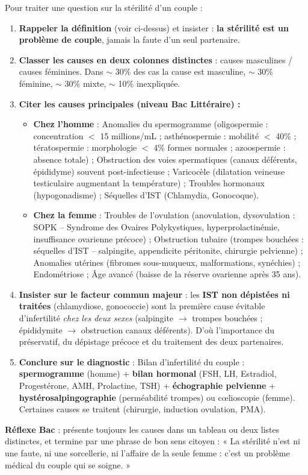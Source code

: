 \documentclass[11pt]{article}
\newcommand{\cle}[1]{{\popxbold\color{popdark}#1}}
\begin{document}
\begin{methode}
Pour traiter une question sur la stérilité d'un couple :
\begin{enumerate}
\item \textbf{Rappeler la définition} (voir ci-dessus) et insister : \textbf{la stérilité est un problème de couple}, jamais la faute d'un seul partenaire.
\item \textbf{Classer les causes en deux colonnes distinctes} : causes masculines / causes féminines. Dans $\sim$ 30\% des cas la cause est masculine, $\sim$ 30\% féminine, $\sim$ 30\% mixte, $\sim$ 10\% inexpliquée.
\item \textbf{Citer les causes principales (niveau Bac Littéraire) :}
\begin{itemize}
\item \textbf{Chez l'homme} : \cle{Anomalies du spermogramme} (oligospermie : concentration $<$ 15 millions/mL ; asthénospermie : mobilité $<$ 40\% ; tératospermie : morphologie $<$ 4\% formes normales ; azoospermie : absence totale) ; \cle{Obstruction} des voies spermatiques (canaux déférents, épididyme) souvent post-infectieuse ; \cle{Varicocèle} (dilatation veineuse testiculaire augmentant la température) ; \cle{Troubles hormonaux} (hypogonadisme) ; \cle{Séquelles d'IST} (Chlamydia, Gonocoque).
\item \textbf{Chez la femme} : \cle{Troubles de l'ovulation} (anovulation, dysovulation : SOPK -- Syndrome des Ovaires Polykystiques, hyperprolactinémie, insuffisance ovarienne précoce) ; \cle{Obstruction tubaire} (trompes bouchées : séquelles d'IST -- salpingite, appendicite péritonite, chirurgie pelvienne) ; \cle{Anomalies utérines} (fibromes sous-muqueux, malformations, synéchies) ; \cle{Endométriose} ; \cle{Âge avancé} (baisse de la réserve ovarienne après 35 ans).
\end{itemize}
\item \textbf{Insister sur le facteur commun majeur} : les \textbf{IST non dépistées ni traitées} (chlamydiose, gonococcie) sont la première cause évitable d'infertilité \emph{chez les deux sexes} (salpingite $\rightarrow$ trompes bouchées ; épididymite $\rightarrow$ obstruction canaux déférents). D'où l'importance du préservatif, du dépistage précoce et du traitement des deux partenaires.
\item \textbf{Conclure sur le diagnostic} : Bilan d'infertilité du couple : \textbf{spermogramme} (homme) + \textbf{bilan hormonal} (FSH, LH, Estradiol, Progestérone, AMH, Prolactine, TSH) + \textbf{échographie pelvienne} + \textbf{hystérosalpingographie} (perméabilité trompes) ou cœlioscopie (femme). Certaines causes se traitent (chirurgie, induction ovulation, PMA).
\end{enumerate}
\textbf{Réflexe Bac} : présente toujours les causes dans un tableau ou deux listes distinctes, et termine par une phrase de bon sens citoyen : « La stérilité n'est ni une faute, ni une sorcellerie, ni l'affaire de la seule femme : c'est un problème médical du couple qui se soigne. »
\end{methode}
\end{document}
